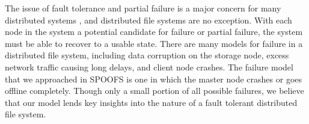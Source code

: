 The issue of fault tolerance and partial failure is a major concern for many distributed systems \cite{waldo_note94}, and distributed file systems are no exception.  With each node in the system a potential candidate for failure or partial failure, the system must be able to recover to a usable state.  There are many models for failure in a distributed file system, including data corruption on the storage node, excess network traffic causing long delays, and client node crashes.  The failure model that we approached in SPOOFS is one in which the master node crashes or goes offline completely.  Though only a small portion of all possible failures, we believe that our model lends key insights into the nature of a fault tolerant distributed file system.